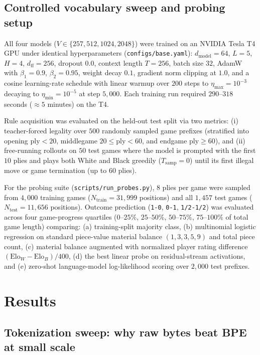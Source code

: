 \documentclass[11pt]{article}
\begin{document}
\subsection{Controlled vocabulary sweep and probing setup}

All four models ($V \in \{257, 512, 1024, 2048\}$) were trained on an NVIDIA Tesla T4 GPU under identical hyperparameters (\texttt{configs/base.yaml}): $d_{\mathrm{model}}=64$, $L=5$, $H=4$, $d_{\mathrm{ff}}=256$, dropout $0.0$, context length $T=256$, batch size $32$, AdamW \citep{loshchilov2019adamw} with $\beta_1=0.9$, $\beta_2=0.95$, weight decay $0.1$, gradient norm clipping at $1.0$, and a cosine learning-rate schedule with linear warmup over $200$ steps to $\eta_{\max}=10^{-3}$ decaying to $\eta_{\min}=10^{-5}$ at step $5{,}000$. Each training run required $290$--$318$ seconds (${\approx}5$ minutes) on the T4.

Rule acquisition was evaluated on the held-out test split via two metrics: (i) teacher-forced legality over $500$ randomly sampled game prefixes (stratified into opening $\text{ply} < 20$, middlegame $20 \le \text{ply} < 60$, and endgame $\text{ply} \ge 60$), and (ii) free-running rollouts on $50$ test games where the model is prompted with the first $10$ plies and plays both White and Black greedily ($T_{\mathrm{samp}}=0$) until its first illegal move or game termination (up to $60$ plies).

For the probing suite (\texttt{scripts/run\_probes.py}), $8$ plies per game were sampled from $4{,}000$ training games ($N_{\mathrm{train}} = 31{,}999$ positions) and all $1{,}457$ test games ($N_{\mathrm{test}} = 11{,}656$ positions). Outcome prediction (\texttt{1-0}, \texttt{0-1}, \texttt{1/2-1/2}) was evaluated across four game-progress quartiles ($0$--$25\%$, $25$--$50\%$, $50$--$75\%$, $75$--$100\%$ of total game length) comparing: (a) training-split majority class, (b) multinomial logistic regression on standard piece-value material balance $(1, 3, 3, 5, 9)$ and total piece count, (c) material balance augmented with normalized player rating difference $(\mathrm{Elo}_W - \mathrm{Elo}_B)/400$, (d) the best linear probe on residual-stream activations, and (e) zero-shot language-model log-likelihood scoring over $2{,}000$ test prefixes.

\section{Results}
\label{sec:results}

\subsection{Tokenization sweep: why raw bytes beat BPE at small scale}
\label{sec:res-sweep}
\end{document}
